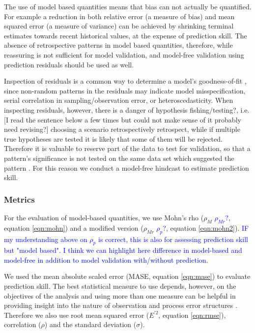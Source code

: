 \documentclass[12pt,halfline,a4paper,nonumbib]{ouparticle}
\newcommand{\toshi}{\textcolor{blue}}
\begin{document}
The use of model based quantities means that bias can not actually be quantified. For example a reduction in both relative error (a measure of bias) and mean squared error (a measure of variance) can be achieved by shrinking terminal estimates towards recent historical values, at the expense of prediction skill. The absence of retrospective patterns in model based quantities, therefore, while reassuring is not sufficient for model validation, and model-free validation using prediction residuals should be used as well.

Inspection of residuals is a common way to determine a model’s goodness-of-fit \parencite{cox1968general}, since  non-random patterns in the residuals may indicate model misspecification, serial correlation in sampling/observation error, or heteroscedasticity. When inspecting residuals, however, there is a danger of hypothesis fishing/testing?, i.e. [I read the sentence below a few times but could not make sense of it probably need revising?] choosing a scenario retrospectively retrospect, while if multiple true hypotheses are tested it is likely that some of them will be rejected. Therefore it is valuable to reserve part of the data to test for validation, so that a pattern’s significance is not tested on the same data set which suggested the pattern \parencite{thygesen2017validation}. For this reason we conduct a model-free hindcast to estimate prediction skill.

\subsubsection{Metrics}

For the evaluation of model-based quantities, we use Mohn's rho ($\rho_M$ \toshi{$\rho_{Mr}$?}, equation \ref{eqn:mohn}) and a modified version ($\rho_{Mr}$ \toshi{$\rho_{p}$?}, equation \ref{eqn:mohn2}). \toshi{IF my understanding above on $\rho_{p}$ is correct, this is also for assessing prediction skill but "model based". I think we can highlight here difference in model-based and model-free in addition to model validation with/without prediction.}

We used the mean absolute scaled error (MASE, equation \ref{eqn:mase}) to evaluate prediction skill. The best statistical measure to use depends, however, on the objectives of the analysis and using more than one measure can be helpful in providing insight into the nature of observation and process error structures \parencite{kell2016xval}. Therefore we also use root mean squared error ($E^{\prime 2}$, equation \ref{eqn:rmse}), correlation ($\rho$) and the standard deviation ($\sigma$). 
\end{document}
